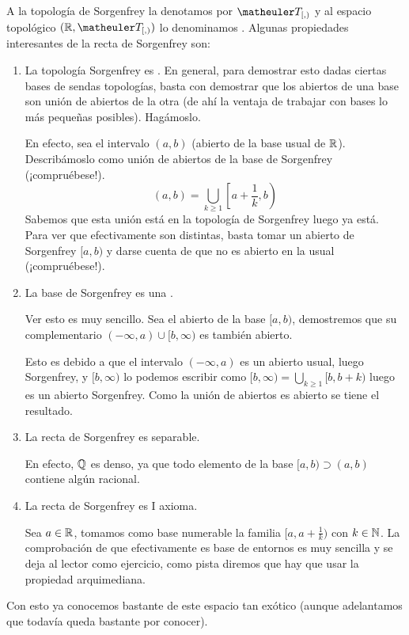 	\begin{exa}
		\label{etop_sorgenfrey}
		A la topología de Sorgenfrey la denotamos por $\T_{[,)}$ y al espacio topológico $(\R,\T_{[,)})$ lo denominamos . Algunas propiedades interesantes de la recta de Sorgenfrey son:
	\begin{enumerate}
		\item La topología Sorgenfrey es . En general, para demostrar esto dadas ciertas bases de sendas topologías, basta con demostrar que los abiertos de una base son unión de abiertos de la otra (de ahí la ventaja de trabajar con bases lo más pequeñas posibles). Hagámoslo.
		
		En efecto, sea el intervalo $(a,b)$ (abierto de la base usual de $\mathbb{R}$). Describámoslo como unión de abiertos de la base de Sorgenfrey (¡compruébese!).
		\begin{equation}
			(a,b) = \bigcup_{k\geq 1} \left[a+\frac{1}{k},b\right)
		\end{equation}
		Sabemos que esta unión está en la topología de Sorgenfrey luego ya está.
	Para ver que efectivamente son distintas, basta tomar un abierto de Sorgenfrey $[a,b)$ y darse cuenta de que no es abierto en la usual (¡compruébese!).
	
	\item La base de Sorgenfrey es una .
	
	Ver esto es muy sencillo. Sea el abierto de la base $[a,b)$, demostremos que su complementario $(-\infty, a) \cup [b,\infty)$ es también abierto.
	
	Esto es debido a  que el intervalo $(-\infty, a)$ es un abierto usual, luego Sorgenfrey, y $[b,\infty)$ lo podemos escribir como $[b,\infty) = \bigcup_{k\geq1} [b, b+k)$ luego es un abierto Sorgenfrey. Como la unión de abiertos es abierto se tiene el resultado.
	\item La recta de Sorgenfrey es separable.
	
	En efecto, $\mathbb{Q}$ es denso, ya que todo elemento de la base $[a,b)\supset(a,b)$ contiene algún racional.
	\item La recta de Sorgenfrey es I axioma.
	
	Sea $a\in\mathbb{R}$, tomamos como base numerable la familia $[a, a+\frac{1}{k})$ con $k\in\mathbb{N}$. La comprobación de que efectivamente es base de entornos es muy sencilla y se deja al lector como ejercicio, como pista diremos que hay que usar la propiedad arquimediana.
	\end{enumerate}
	Con esto ya conocemos bastante de este espacio tan exótico (aunque adelantamos que todavía queda bastante por conocer).
\end{exa}


